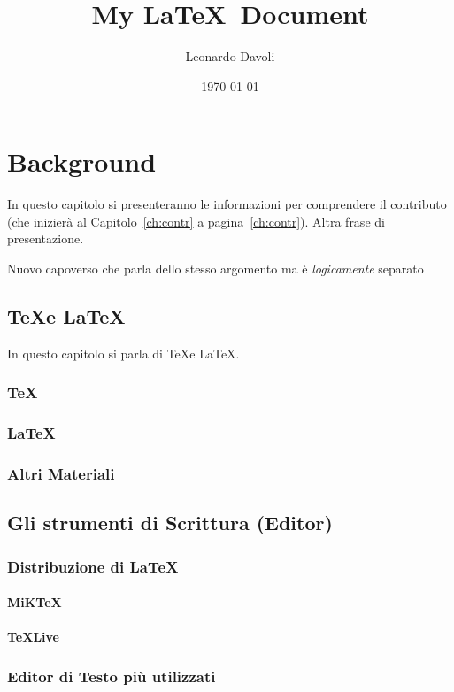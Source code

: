 \documentclass[11pt,b5paper,openany,titlepage,twoside]{book}
\title{My \LaTeX\ Document}
\author{Leonardo Davoli}
\date{\today}
\begin{document}
	
	\frontmatter
	\maketitle
	\tableofcontents

	\mainmatter
	\chapter{Background}
	\minitoc
	\mtcskip
	In questo capitolo si presenteranno le informazioni per comprendere il contributo (che inizierà al Capitolo~\ref{ch:contr} a pagina~\ref{ch:contr}).
	Altra frase di presentazione.

	Nuovo capoverso che parla dello stesso argomento ma è \emph{logicamente} separato
	
	\section{\TeX e \LaTeX}
	In questo capitolo si parla di \TeX e \LaTeX.
	\blindtext
	\subsection{\TeX}
	\Blindtext
	\subsection{\LaTeX}
	\Blindtext
	\subsection*{Altri Materiali}
	\blindtext

	\section{Gli strumenti di Scrittura (Editor)}
	
	\subsection{Distribuzione di \LaTeX}
	\subsubsection{MiK\TeX}
	\subsubsection{\TeX Live}

	\subsection{Editor di Testo più utilizzati}
\end{document}
